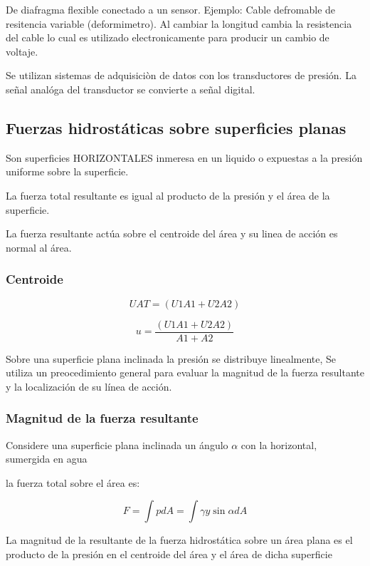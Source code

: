 \documentclass{article}
\begin{document}
De diafragma flexible conectado a un sensor. Ejemplo: Cable defromable de resitencia variable (deformimetro). Al cambiar la longitud cambia la resistencia del cable lo cual es utilizado electronicamente para producir un cambio de voltaje.

Se utilizan sistemas de adquisiciòn de datos con los transductores de presión. La señal analóga del transductor se convierte a señal digital. 

\subsection{Fuerzas hidrostáticas sobre superficies planas}
Son superficies HORIZONTALES inmeresa en un liquido o expuestas a la presión uniforme sobre la superficie.

La fuerza total resultante es igual al producto de la presión y el área de la superficie.

La fuerza resultante actúa sobre el centroide del área y su linea de acción es normal al área.

\subsubsection{Centroide}

\begin{equation}
 UAT= (U1A1 + U2A2)
\end{equation}

\begin{equation}
 u=\dfrac {(U1A1 + U2A2)}{A1 + A2}
\end{equation}

 Sobre una superficie plana inclinada la presión se distribuye linealmente, Se utiliza un preocedimiento general para evaluar la magnitud de la fuerza resultante y la localización de su línea de acción.

\subsubsection{Magnitud de la fuerza resultante}
Considere una superficie plana inclinada un ángulo $\alpha$ con la horizontal, sumergida en agua

la fuerza total sobre el área es: 

\begin{equation}
 F = \int p dA  = \int{\gamma} y {\sin}{\alpha}dA
\end{equation}

La magnitud de la resultante de la fuerza hidrostática sobre un área plana es el producto de la presión en el centroide del área y el área de dicha superficie
\end{document}
